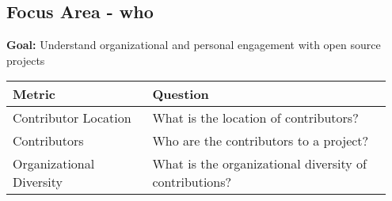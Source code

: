 
\subsection{Focus Area - who}
\textbf{Goal:} Understand organizational and personal engagement with open source projects
\begin{table}[ht!]
    \centering
    \begin{tabular}{|p{0.35\linewidth} | p{0.6\linewidth}|}
        \hline
        \hfil \textbf{Metric}  & \hfil \textbf{Question} \\
        \hline
		Contributor Location & What is the location of contributors? \\ 
		\hline
		Contributors & Who are the contributors to a project? \\ 
		\hline
		Organizational Diversity & What is the organizational diversity of contributions? \\ 
		\hline
    \end{tabular}
\end{table}
